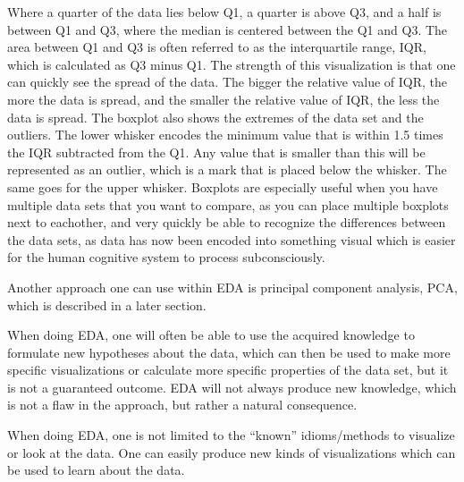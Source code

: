 \documentclass[Report.tex]{subfiles}
\begin{document}
Where a quarter of the data lies below Q1, a quarter is above Q3, and a half is between Q1 and Q3, where the median is centered between
the Q1 and Q3. The area between Q1 and Q3 is often referred to as the interquartile range, IQR, which is calculated as Q3 minus Q1. The strength of this visualization is that one can quickly see the spread of the data. The bigger the relative value of IQR, the more the data is spread, and the smaller the relative value of IQR, the less the data is spread. The boxplot also shows the extremes of the data set and the outliers. The lower whisker encodes the minimum value that is within 1.5 times the IQR subtracted from the Q1. Any value that is smaller than this will be represented as an outlier, which is a mark that is placed below the whisker. The same goes for the upper whisker. Boxplots are especially useful when you have multiple data sets that you want to compare, as you can place multiple boxplots next to eachother, and very quickly be able to recognize the differences between the data sets, as data has now been encoded into something visual which is easier for the human cognitive system to process subconsciously.

Another approach one can use within EDA is principal component analysis, PCA, which is described in a later section.

When doing EDA, one will often be able to use the acquired knowledge to formulate new hypotheses about the data, which can then
be used to make more specific visualizations or calculate more specific properties of the data set, but it
is not a guaranteed outcome. EDA will not always produce new knowledge, which is not a flaw in the approach,
but rather a natural consequence.

When doing EDA, one is not limited to the ``known'' idioms/methods to visualize or look at the data. One can easily
produce new kinds of visualizations which can be used to learn about the data.


\end{document}
